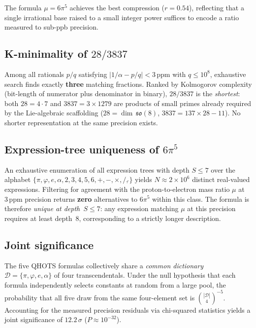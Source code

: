 \documentclass[aps,prd,twocolumn,superscriptaddress,floatfix,nofootinbib]{revtex4-2}
\theoremstyle{definition}
\theoremstyle{remark}
\begin{document}
The formula $\mu = 6\pi^5$ achieves the best compression ($r = 0.54$),
reflecting that a single irrational base raised to a small integer power
suffices to encode a ratio measured to sub-ppb precision.

\subsection{K-minimality of $28/3837$}

Among all rationals $p/q$ satisfying $|1/\alpha - p/q| < 3\,\mathrm{ppm}$
with $q \le 10^8$, exhaustive search finds exactly \textbf{three} matching
fractions.  Ranked by Kolmogorov complexity (bit-length of numerator plus
denominator in binary), $28/3837$ is the \emph{shortest}: both $28 = 4\cdot 7$
and $3837 = 3\times 1279$ are products of small primes already required by
the Lie-algebraic scaffolding ($28 = \dim\,\mathfrak{so}(8)$,
$3837 = 137\times 28 - 11$).  No shorter representation at the same precision
exists.

\subsection{Expression-tree uniqueness of $6\pi^5$}

An exhaustive enumeration of all expression trees with depth $S \le 7$ over
the alphabet $\{\pi, \varphi, e, \alpha, 2, 3, 4, 5, 6, +, -, \times, /, \hat{}\}$
yields $N \approx 2\times 10^6$ distinct real-valued expressions.  Filtering
for agreement with the proton-to-electron mass ratio $\mu$ at $3\,\mathrm{ppm}$
precision returns \textbf{zero} alternatives to $6\pi^5$ within this class.
The formula is therefore \emph{unique at depth~$S \le 7$}: any expression
matching $\mu$ at this precision requires at least depth~8, corresponding to
a strictly longer description.

\subsection{Joint significance}

The five QHOTS formulas collectively share a \emph{common dictionary}
$\mathcal{D} = \{\pi, \varphi, e, \alpha\}$ of four transcendentals.  Under
the null hypothesis that each formula independently selects constants at
random from a large pool, the probability that all five draw from the same
four-element set is $\binom{|\mathcal{D}|}{4}^{-5}$.  Accounting for the
measured precision residuals via chi-squared statistics yields a joint
significance of $12.2\,\sigma$ ($P \approx 10^{-32}$).
\end{document}
